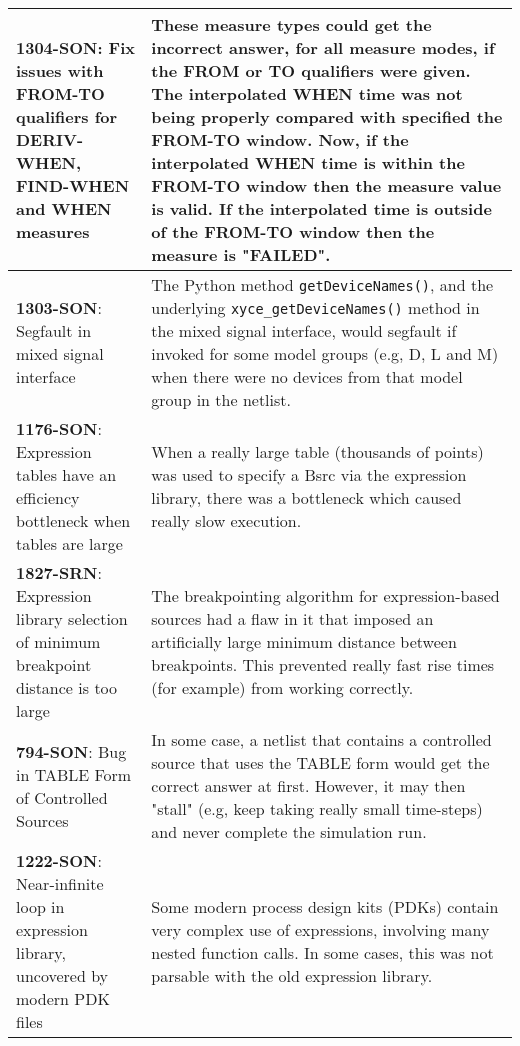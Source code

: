 {\begin{longtable}[h] {>{\raggedright\small}m{2in}|>{\raggedright\let\\\tabularnewline\small}m{3.5in}}
\textbf{1304-SON}: Fix issues with FROM-TO qualifiers for DERIV-WHEN,
FIND-WHEN and WHEN measures & These measure types could get the incorrect
answer, for all measure modes, if the FROM or TO qualifiers
were given.  The interpolated WHEN time was not being properly compared with
specified the FROM-TO window.  Now, if the interpolated WHEN time is within
the FROM-TO window then the measure value is valid.  If the interpolated
time is outside of the FROM-TO window then the measure is "FAILED".
\\ \hline

\textbf{1303-SON}: Segfault in mixed signal interface &
The Python method \texttt{getDeviceNames()}, and the underlying
\texttt{xyce\_getDeviceNames()} method in the mixed signal interface,
would segfault if invoked for some model groups (e.g, D, L and M) when
there were no devices from that model group in the \Xyce{} netlist.
\\ \hline

\textbf{1176-SON}: Expression tables have an efficiency bottleneck when tables are large &
When a really large table (thousands of points) was used to specify a Bsrc 
via the expression library, there was a bottleneck which caused really slow execution.
\\ \hline

\textbf{1827-SRN}: Expression library selection of minimum breakpoint distance is too large &
The breakpointing algorithm for expression-based sources had a flaw in it that 
imposed an artificially large minimum distance between breakpoints.  This 
prevented really fast rise times (for example) from working correctly.
\\ \hline

\textbf{794-SON}: Bug in TABLE Form of \Xyce{} Controlled Sources & 
In some case, a \Xyce{} netlist that contains a controlled source that uses the 
TABLE form would get the correct answer at first.  However, it may then "stall" 
(e.g, keep taking really small time-steps) and never complete the simulation run.
\\ \hline

\textbf{1222-SON}: Near-infinite loop in expression library, uncovered by modern PDK files  & 
Some modern process design kits (PDKs) contain very complex use of expressions, 
involving many nested function calls.  In some cases, this was not parsable with
the old \Xyce{} expression library.
\\ \hline

\end{longtable}
}
